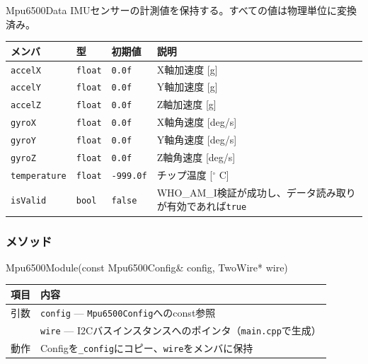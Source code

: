 \begin{funcblock}{Mpu6500Data}
IMUセンサーの計測値を保持する。すべての値は物理単位に変換済み。

\begin{longtable}{l l l p{4.8cm}}
\toprule
\textbf{メンバ} & \textbf{型} & \textbf{初期値} & \textbf{説明} \\
\midrule
\endhead
\texttt{accelX}      & \texttt{float} & \texttt{0.0f}     & X軸加速度 [g] \\
\texttt{accelY}      & \texttt{float} & \texttt{0.0f}     & Y軸加速度 [g] \\
\texttt{accelZ}      & \texttt{float} & \texttt{0.0f}     & Z軸加速度 [g] \\
\texttt{gyroX}       & \texttt{float} & \texttt{0.0f}     & X軸角速度 [deg/s] \\
\texttt{gyroY}       & \texttt{float} & \texttt{0.0f}     & Y軸角速度 [deg/s] \\
\texttt{gyroZ}       & \texttt{float} & \texttt{0.0f}     & Z軸角速度 [deg/s] \\
\texttt{temperature} & \texttt{float} & \texttt{-999.0f}  & チップ温度 [$^{\circ}$ C] \\
\texttt{isValid}     & \texttt{bool}  & \texttt{false}    & WHO\_AM\_I検証が成功し、データ読み取りが有効であれば\texttt{true} \\
\bottomrule
\end{longtable}
\end{funcblock}

\subsubsection{メソッド}

\begin{funcblock}{Mpu6500Module(const Mpu6500Config\& config, TwoWire* wire)}
\begin{tabularx}{\textwidth}{l X}
\toprule
\textbf{項目} & \textbf{内容} \\
\midrule
引数   & \texttt{config} --- \texttt{Mpu6500Config}へのconst参照 \\
       & \texttt{wire} --- I2Cバスインスタンスへのポインタ（\texttt{main.cpp}で生成） \\
動作   & Configを\texttt{\_config}にコピー、\texttt{wire}をメンバに保持 \\
\bottomrule
\end{tabularx}
\end{funcblock}

